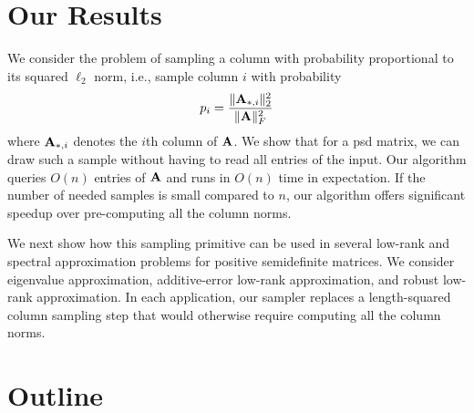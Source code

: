 \section{Our Results}
We consider the problem of sampling a column with probability proportional to its squared $\ell_2$ norm, i.e., sample column $i$ with probability 
\[p_i = \frac{\|\mathbf{A}_{*, i}\|^2_2}{\|\mathbf{A}\|^2_F}\]
where $\mathbf{A}_{*, i}$ denotes the $i$th column of $\mathbf{A}$. We show that for a psd matrix, we can draw such a sample without having to read all entries of the input. Our algorithm queries $O(n)$ entries of $\mathbf{A}$ and runs in $O(n)$ time in expectation. If the number of needed samples is small compared to $n$, our algorithm offers significant speedup over pre-computing all the column norms. 



We next show how this sampling primitive can be used in several low-rank and spectral approximation problems for positive semidefinite matrices. We consider eigenvalue approximation, additive-error low-rank approximation, and robust low-rank approximation. In each application, our sampler replaces a length-squared column sampling step that would otherwise require computing all the column norms.




\section{Outline}
\label{sec:introduction-outline}

